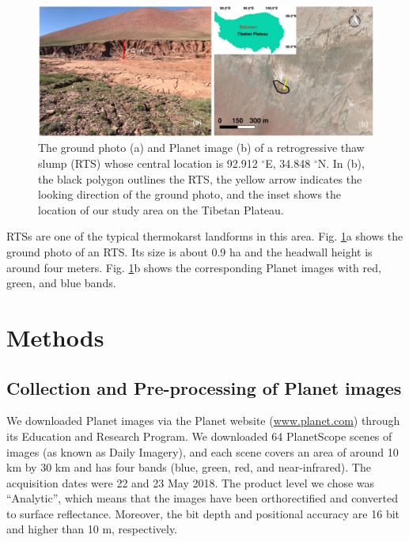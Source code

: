 \documentclass[preprint,12pt,authoryear]{elsarticle}
\begin{document}
\begin{figure}[ht]
	\centering
	\includegraphics[width=14cm]{figures/study_area_loc_RTS_photo_trim.jpg}
	\caption{The ground photo (a) and Planet image (b) of a retrogressive thaw slump (RTS) whose central location is 92.912 $^\circ$E, 34.848 $^\circ$N. In (b), the black polygon outlines the RTS, the yellow arrow indicates the looking direction of the ground photo, and the inset shows the location of our study area on the Tibetan Plateau.}
	\label{fig_rts_groundphoto}
\end{figure}

RTSs are one of the typical thermokarst landforms in this area. Fig. \ref{fig_rts_groundphoto}a shows the ground photo of an RTS. Its size is about 0.9 ha and the headwall height is around four meters. Fig. \ref{fig_rts_groundphoto}b shows the corresponding Planet images with red, green, and blue bands. 

\section{Methods}
\label{sec_meth}

\subsection{Collection and Pre-processing of Planet images}
\label{subsec_collect_images}

We downloaded Planet images via the Planet website (\url{www.planet.com}) through its Education and Research Program. We downloaded 64 PlanetScope scenes of images (as known as Daily Imagery), and each scene covers an area of around 10 km by 30 km and has four bands (blue, green, red, and near-infrared). The acquisition dates were  22 and 23 May 2018. The product level we chose was ``Analytic'', which means that the images have been orthorectified and converted to surface reflectance. Moreover, the bit depth and positional accuracy are 16 bit and higher than 10 m, respectively. %
\end{document}
